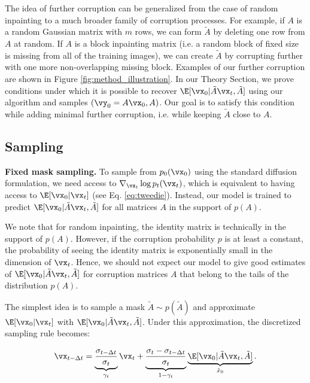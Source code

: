 \documentclass{article}
\begin{document}
The idea of further corruption can be generalized from the case of random inpainting to a much broader family of corruption processes. For example, if $A$ is a random Gaussian matrix with $m$ rows, we can form $\tilde{A}$ by deleting one row from $A$ at random. If $A$ is a block inpainting matrix (i.e. a random block of fixed size is missing from all of the training images), we can create $\tilde{A}$ by corrupting further with one more non-overlapping missing block. Examples of our further corruption are shown in Figure \ref{fig:method_illustration}. In our Theory Section, we prove conditions under which it is possible to recover $\E[\vx_0 | \tilde{A}\vx_t, \tilde{A}]$ using our algorithm and samples $(\vy_0=A\vx_0, A)$. Our goal is to satisfy this condition while adding minimal further corruption, i.e. while keeping $\tilde{A}$ close to $A$.









\subsection{Sampling}

\textbf{Fixed mask sampling.} To sample from $p_0(\vx_0)$ using the standard diffusion formulation, we need access to $\nabla_{\vx_t} \log p_t(\vx_t)$, which is equivalent to having access to $\E[\vx_0|\vx_t]$ (see Eq. \ref{eq:tweedie}). Instead, our model is trained to predict $\E[\vx_0 | \tilde{A}\vx_t, \tilde{A}]$ for all matrices $A$ in the support of $p(A)$.

We note that for random inpainting, the identity matrix is technically in the support of $p(A)$. However, if the corruption probability $p$ is at least a constant, the probability of seeing the identity matrix is exponentially small in the dimension of $\vx_t$. Hence, we should not expect our model to give good estimates of $\E[\vx_0 | \tilde{A}\vx_t, \tilde{A}]$ for corruption matrices $A$ that belong to the tails of the distribution $p(A)$. %


The simplest idea is to sample a mask $\tilde{A} \sim p(\tilde{A})$ and approximate $\E[\vx_0|\vx_t]$ with $\E[\vx_0| \tilde{A}\vx_t, \tilde{A}]$. Under this approximation, the discretized sampling rule becomes:

\begin{gather}
    \vx_{t - \Delta t} =
    \underbrace{\frac{\sigma_{t - \Delta t}}{\sigma_t}}_{\gamma_t}\vx_t + \underbrace{\frac{\sigma_t - \sigma_{t - \Delta t}}{\sigma_t}}_{1 - \gamma_t}\underbrace{\E[\vx_0 | \tilde{A}\vx_t, \tilde{A}]}_{\hat x_0}.
    \label{eq:fixed_mask_update_rule}
\end{gather}
\end{document}
